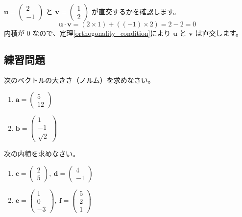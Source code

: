 \begin{ex}
$\bm{u} = \begin{pmatrix} 2 \\ -1 \end{pmatrix}$ と $\bm{v} = \begin{pmatrix} 1 \\ 2 \end{pmatrix}$ が直交するかを確認します。
\[\bm{u} \cdot \bm{v} = (2 \times 1) + ((-1) \times 2) = 2 - 2 = 0\]
内積が $0$ なので、定理\ref{orthogonality_condition}により $\bm{u}$ と $\bm{v}$ は直交します。
\end{ex}

\subsection{練習問題}

\begin{quiz}
次のベクトルの大きさ（ノルム）を求めなさい。
\begin{enumerate}
\item $\bm{a} = \begin{pmatrix} 5 \\ 12 \end{pmatrix}$
\item $\bm{b} = \begin{pmatrix} 1 \\ -1 \\ \sqrt{2} \end{pmatrix}$
\end{enumerate}
\end{quiz}

\begin{quiz}
次の内積を求めなさい。
\begin{enumerate}
\item $\bm{c} = \begin{pmatrix} 2 \\ 5 \end{pmatrix},\ \bm{d} = \begin{pmatrix} 4 \\ -1 \end{pmatrix}$
\item $\bm{e} = \begin{pmatrix} 1 \\ 0 \\ -3 \end{pmatrix},\ \bm{f} = \begin{pmatrix} 5 \\ 2 \\ 1 \end{pmatrix}$
\end{enumerate}
\end{quiz}

